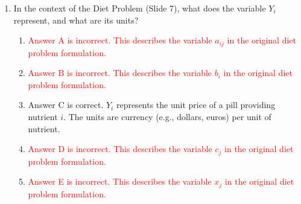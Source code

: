 \documentclass{article}%
\newcommand{\incorrect}[1]{\textcolor{red}{#1}}
\begin{document}
\begin{enumerate}
\begin{enumerate}%
\item \incorrect{Answer A is incorrect. While $m$ might be a rough estimate in some cases, Slide 1 explicitly states a tighter bound of $\frac{3m}{2}$ as the typical upper limit.}%
\item \incorrect{Answer B is incorrect.  While $3m$ is a possible upper bound in rare cases, the slide indicates that $\frac{3m}{2}$ is the more typical upper bound.}%
\item Answer C is correct. Slide 1 states that the number of iterations is usually bounded above by $\frac{3m}{2}$ under Dantzig's conditions. This relatively small bound contributes to the practical efficiency of the simplex method for problems of moderate size.%
\item \incorrect{Answer D is incorrect. The slide does not suggest a quadratic upper bound. The bound is linear with respect to $m$.}%
\item \incorrect{Answer E is incorrect. Slide 1 explicitly provides a typical upper bound under Dantzig's conditions.}%
\end{enumerate}%
\vspace{1em}%
\item In the context of the Diet Problem (Slide 7), what does the variable $Y_i$ represent, and what are its units?%
\begin{enumerate}%
\item \incorrect{Answer A is incorrect. This describes the variable $a_{ij}$ in the original diet problem formulation.}%
\item \incorrect{Answer B is incorrect. This describes the variable $b_i$ in the original diet problem formulation.}%
\item Answer C is correct.  $Y_i$ represents the unit price of a pill providing nutrient $i$. The units are currency (e.g., dollars, euros) per unit of nutrient.%
\item \incorrect{Answer D is incorrect. This describes the variable $c_j$ in the original diet problem formulation.}%
\item \incorrect{Answer E is incorrect. This describes the variable $x_j$ in the original diet problem formulation.}%
\end{enumerate}%
\vspace{1em}%
\end{enumerate}

%
\end{document}
